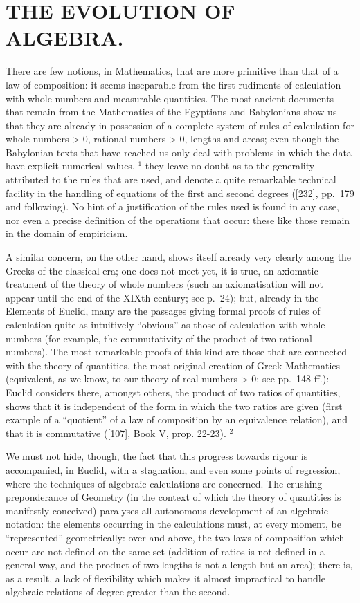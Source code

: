 \chapter{THE EVOLUTION OF ALGEBRA.}

There are few notions, in Mathematics, that are more primitive than that of a law of composition: it seems inseparable from the first rudiments of calculation with whole numbers and measurable quantities. The most ancient documents that remain from the Mathematics of the Egyptians and Babylonians show us that they are already in possession of a complete system of rules of calculation for whole numbers \textgreater{} 0, rational numbers \textgreater{} 0, lengths and areas; even though the Babylonian texts that have reached us only deal with problems in which the data have explicit numerical values, \(^{1}\) they leave no doubt as to the generality attributed to the rules that are used, and denote a quite remarkable technical facility in the handling of equations of the first and second degrees ({[}232{]}, pp.~179 and following). No hint of a justification of the rules used is found in any case, nor even a precise definition of the operations that occur: these like those remain in the domain of empiricism.

A similar concern, on the other hand, shows itself already very clearly among the Greeks of the classical era; one does not meet yet, it is true, an axiomatic treatment of the theory of whole numbers (such an axiomatisation will not appear until the end of the XIXth century; see p.~24); but, already in the Elements of Euclid, many are the passages giving formal proofs of rules of calculation quite as intuitively ``obvious'' as those of calculation with whole numbers (for example, the commutativity of the product of two rational numbers). The most remarkable proofs of this kind are those that are connected with the theory of quantities, the most original creation of Greek Mathematics (equivalent, as we know, to our theory of real numbers \textgreater{} 0; see pp.~148 ff.): Euclid considers there, amongst others, the product of two ratios of quantities, shows that it is independent of the form in which the two ratios are given (first example of a ``quotient'' of a law of composition by an equivalence relation), and that it is commutative ({[}107{]}, Book V, prop. 22-23). \(^{2}\)

We must not hide, though, the fact that this progress towards rigour is accompanied, in Euclid, with a stagnation, and even some points of regression, where the techniques of algebraic calculations are concerned. The crushing preponderance of Geometry (in the context of which the theory of quantities is manifestly conceived) paralyses all autonomous development of an algebraic notation: the elements occurring in the calculations must, at every moment, be ``represented'' geometrically: over and above, the two laws of composition which occur are not defined on the same set (addition of ratios is not defined in a general way, and the product of two lengths is not a length but an area); there is, as a result, a lack of flexibility which makes it almost impractical to handle algebraic relations of degree greater than the second.

